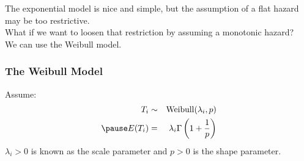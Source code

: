 \documentclass{beamer}
\begin{document}
\begin{frame}
\normalsize
The exponential model is nice and simple, but the assumption of a flat
hazard may be too restrictive.\\
\pause
\bigskip
What if we want to loosen that restriction by assuming a monotonic hazard?\\
\pause
\bigskip
We can use the Weibull model.
\end{frame}

\begin{frame}
\frametitle{The Weibull Model}
Assume:
\begin{eqnarray*}
T_i &\sim& \mathrm{Weibull}(\lambda_i, p)\\
\pause
E(T_i) &=& \lambda_i \Gamma \left( 1 + \frac{1}{p} \right)
\end{eqnarray*}
\pause
$\lambda_i > 0$ is known as the scale parameter and $p > 0$ is the shape parameter.
\pause
\begin{figure}
\begin{center}
\end{center}
\end{figure}
\end{frame}
\end{document}
